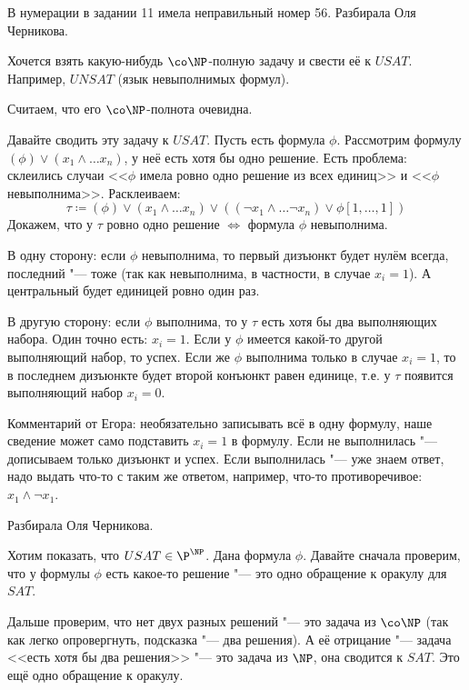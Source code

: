 	\TODO

	В нумерации в задании 11 имела неправильный номер 56.
	Разбирала Оля Черникова.

	Хочется взять какую-нибудь $\co\NP$-полную задачу и свести её к $USAT$.
	Например, $UNSAT$ (язык невыполнимых формул).
	\begin{Rem}
		Считаем, что его $\co\NP$-полнота очевидна.
		\TODO
	\end{Rem}
	Давайте сводить эту задачу к $USAT$.
	Пусть есть формула $\phi$.
	Рассмотрим формулу $(\phi) \lor (x_1 \land \dots x_n)$, у неё есть хотя бы одно решение.
	Есть проблема: склеились случаи <<$\phi$ имела ровно одно решение из всех единиц>> и <<$\phi$ невыполнима>>.
	Расклеиваем:
	\[
		\tau \coloneq (\phi) \lor (x_1 \land \dots x_n) \lor ((\lnot x_1 \land \dots \lnot x_n) \lor \phi[1, \dots, 1])
	\]
	Докажем, что у $\tau$ ровно одно решение $\iff$ формула $\phi$ невыполнима.

	В одну сторону: если $\phi$ невыполнима, то первый дизъюнкт будет нулём всегда, последний "--- тоже (так как невыполнима, в частности, в случае $x_i=1$).
	А центральный будет единицей ровно один раз.

	В другую сторону: если $\phi$ выполнима, то у $\tau$ есть хотя бы два выполняющих набора.
	Один точно есть: $x_i=1$.
	Если у $\phi$ имеется какой-то другой выполняющий набор, то успех.
	Если же $\phi$ выполнима только в случае $x_i=1$, то в последнем дизъюнкте будет второй конъюнкт равен единице,
	т.е. у $\tau$ появится выполняющий набор $x_i=0$.

	\begin{Rem}
		Комментарий от Егора: необязательно записывать всё в одну формулу, наше сведение может само подставить $x_i=1$ в формулу.
		Если не выполнилась "--- дописываем только дизъюнкт и успех.
		Если выполнилась "--- уже знаем ответ, надо выдать что-то с таким же ответом, например, что-то противоречивое: $x_1 \land \lnot x_1$.
	\end{Rem}

	Разбирала Оля Черникова.

	Хотим показать, что $USAT \in \P^{\NP}$.
	Дана формула $\phi$.
	Давайте сначала проверим, что у формулы $\phi$ есть какое-то решение "--- это одно обращение к оракулу для $SAT$.

	Дальше проверим, что нет двух разных решений "--- это задача из $\co\NP$ (так как легко опровергнуть, подсказка "--- два решения).
	А её отрицание "--- задача <<есть хотя бы два решения>> "--- это задача из $\NP$, она сводится к $SAT$.
	Это ещё одно обращение к оракулу.
